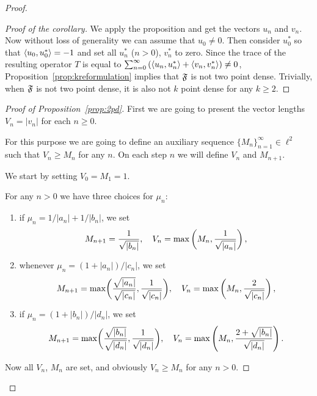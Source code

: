 \begin{proof}
\begin{proof}[Proof of the corollary]
        We apply the proposition and get the vectors $u_n$ and $v_n$.
        Now without loss of generality we can assume that $u_0 \neq 0$.
        Then consider $u^*_0$ so that $\langle u_0, u^*_0 \rangle = -1$ and set all $u^*_n$ ($n > 0$), $v^*_n$ to zero.
        Since the trace of the resulting operator $T$ is equal to $\sum_{n=0}^\infty \left(\langle u_n, u^*_n \rangle + \langle v_n, v^*_n \rangle\right) \neq 0$,
          Proposition~\ref{prop:kreformulation} implies that $\mathfrak{F}$ is not two point dense.
        Trivially, when $\mathfrak{F}$ is not two point dense, it is also not $k$ point dense for any $k \geq 2$.
      \end{proof}
      \begin{proof}[Proof of Proposition~\ref{prop:2pd}]
        First we are going to present the vector lengths $V_n = \lvert v_n \rvert$ for each $n \geq 0$.

        For this purpose we are going to define an auxiliary sequence $\{M_n\}_{n=1}^\infty \in \ell^2$ such that $V_n \geq M_n$ for any $n$.
        On each step $n$ we will define $V_n$ and $M_{n+1}$.

        We start by setting $V_0 = M_1 = 1$.

        For any $n > 0$ we have three choices for $\mu_n$:
        \begin{enumerate}
          \item if $\mu_n = 1/\lvert a_n \rvert+ 1/\lvert b_n \rvert$, we set 
              \[
                M_{n+1} = \frac{1}{\sqrt{\smash[b]{\lvert b_n \rvert}}}, \quad
                V_n = \max\left(M_n, \frac{1}{\sqrt{\smash[b]{\lvert a_n \rvert}}}\right),
              \]
          \item whenever $\mu_n = (1 + \lvert a_n \rvert)/\lvert c_n \rvert$, we set 
              \[
                M_{n+1} = \max\biggl(\smash[b]{\frac{\sqrt{|a_n|}}{\sqrt{\lvert c_n \rvert}}}, \frac{1}{\sqrt{\smash[b]{\lvert c_n \rvert}}}\biggr), \quad
                V_n = \max\left(M_n, \frac{2}{\sqrt{\smash[b]{|c_n|}}}\right),
              \]
          \item if $\mu_n = (1 + \lvert b_n \rvert)/\lvert d_n \rvert$, we set 
              \[
                M_{n+1} = \max\biggl(\smash[t]{\frac{\sqrt{\lvert b_n \rvert}}{\sqrt{\lvert d_n \rvert}}}, \frac{1}{\sqrt{\smash[b]{\lvert d_n \rvert}}}\biggr), \quad
                V_n = \max\left(M_n, \frac{2 + \sqrt{\lvert b_n\rvert}}{\sqrt{\smash[b]{\lvert d_n \rvert}}}\right).
              \]
        \end{enumerate}
        Now all $V_n$, $M_n$ are set, and obviously $V_n \geq M_n$ for any $n > 0$.
        

\end{proof}
\end{proof}
